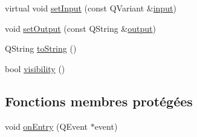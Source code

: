 \begin{DoxyCompactItemize}
\item 
virtual void \hyperlink{classSimpleHotel_1_1SH__QuestionState_ae404d8874e542fd5f3e6d658f003bae4}{set\-Input} (const Q\-Variant \&\hyperlink{classSimpleHotel_1_1SH__InOutState_a487d2ca6200fed372b1a27cfa27774db}{input})
\item 
void \hyperlink{classSimpleHotel_1_1SH__DatabaseContentQuestionState_ab85498797a0318417580ad3f274b018a}{set\-Output} (const Q\-String \&\hyperlink{classSimpleHotel_1_1SH__InOutState_a71b15e4d49b9c2aa540500065ceb39da}{output})
\item 
Q\-String \hyperlink{classSimpleHotel_1_1SH__GenericState_adaded78178f9999a9e07a32871af5e61}{to\-String} ()
\item 
bool \hyperlink{classSimpleHotel_1_1SH__InOutState_a145a6e0e2c9e22971e35aa4538adeb4a}{visibility} ()
\end{DoxyCompactItemize}
\subsection*{Fonctions membres protégées}
\begin{DoxyCompactItemize}
\item 
void \hyperlink{classSimpleHotel_1_1SH__GenericState_adebdb330ff20556a54a833b15e50eacc}{on\-Entry} (Q\-Event $\ast$event)
\end{DoxyCompactItemize}
